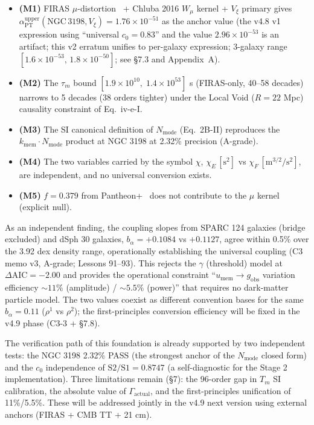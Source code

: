 \documentclass[11pt,a4paper]{article}
\newcommand{\kmem}{k_{\mathrm{mem}}}
\newcommand{\Vxi}{V_{\xi}}
\newcommand{\Tm}{T_{m}}
\newcommand{\Nmode}{N_{\mathrm{mode}}}
\newcommand{\aPT}{\alpha_{\mathrm{PT}}}
\newcommand{\taum}{\tau_{m}}
\newcommand{\bal}{b_{\alpha}}
\newcommand{\umem}{u_{\mathrm{mem}}}
\newcommand{\Wmu}{W_{\mu}}
\newcommand{\Gammaact}{\Gamma_{\mathrm{actual}}}
\newcommand{\gobs}{g_{\mathrm{obs}}}
\newcommand{\AIC}{\Delta\mathrm{AIC}}
\begin{document}
\begin{itemize}[leftmargin=*,itemsep=3pt]
\item \textbf{(M1)} FIRAS $\mu$-distortion~\citep{Fixsen1996} + Chluba 2016 $\Wmu$ kernel + $\Vxi$
primary gives $\aPT^{\mathrm{upper}}(\mathrm{NGC\,3198}, \Vxi) = 1.76 \times 10^{-51}$ as the anchor
value (the v4.8 v1 expression using ``universal $c_0 = 0.83$'' and the value $2.96 \times 10^{-53}$
is an artifact; this v2 erratum unifies to per-galaxy expression; 3-galaxy range
$[1.6\times10^{-53},\,1.8\times10^{-50}]$; see \S 7.3 and Appendix~A).

\item \textbf{(M2)} The $\taum$ bound $[1.9 \times 10^{10},\; 1.4 \times 10^{53}]$ s (FIRAS-only,
40--58 decades) narrows to 5 decades (38 orders tighter) under the Local Void ($R = 22$ Mpc)
causality constraint of Eq.~iv-e-I.

\item \textbf{(M3)} The SI canonical definition of $\Nmode$ (Eq.~2B-II) reproduces the
$\kmem \cdot \Nmode$ product at NGC 3198 at 2.32\% precision (A-grade).

\item \textbf{(M4)} The two variables carried by the symbol $\chi$,
$\chi_E\,[\mathrm{s}^2]$ vs $\chi_F\,[\mathrm{m}^{3/2}/\mathrm{s}^2]$, are independent, and no
universal conversion exists.

\item \textbf{(M5)} $f = 0.379$ from Pantheon+~\citep{Scolnic2022} does not contribute to the
$\mu$ kernel (explicit null).
\end{itemize}

As an independent finding, the coupling slopes from SPARC 124 galaxies (bridge excluded) and dSph
30 galaxies, $\bal = +0.1084$ vs $+0.1127$, agree within 0.5\% over the 3.92 dex density range,
operationally establishing the universal coupling (C3 memo v3, A-grade; Lessons 91--93). This
rejects the $\gamma$ (threshold) model at $\AIC = -2.00$ and provides the operational constraint
``$\umem \to \gobs$ variation efficiency $\sim 11\%$ (amplitude) / $\sim 5.5\%$ (power)'' that
requires no dark-matter particle model. The two values coexist as different convention bases for
the same $\bal = 0.11$ ($\rho^1$ vs $\rho^2$); the first-principles conversion efficiency will be
fixed in the v4.9 phase (C3-3 + \S 7.8).

The verification path of this foundation is already supported by two independent tests: the NGC
3198 2.32\% PASS (the strongest anchor of the $\Nmode$ closed form) and the $c_0$ independence of
$\mathrm{S2/S1} = 0.8747$ (a self-diagnostic for the Stage 2 implementation). Three limitations
remain (\S 7): the 96-order gap in $\Tm$ SI calibration, the absolute value of $\Gammaact$, and the
first-principles unification of 11\%/5.5\%. These will be addressed jointly in the v4.9 next version
using external anchors (FIRAS + CMB TT + 21 cm).
\end{document}
